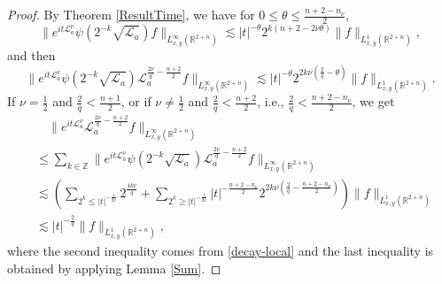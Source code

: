 \documentclass[10pt,a4paper]{amsart}
\begin{document}
\begin{proof}
By Theorem \ref{ResultTime}, we have for $0\leq \theta\leq \frac{n+2-n_\nu}{2}$,
\begin{equation*}
\|e^{it\mathcal{L}_a^\nu} \psi(2^{-k}\sqrt{\mathcal{L}_a})f\|_{L_{x,y}^\infty(\mathbb{R}^{2+n})}\lesssim |t|^{-\theta}2^{k(n+2-2\nu\theta)}\|f\|_{L_{x,y}^1(\mathbb{R}^{2+n})},
\end{equation*}
and then
\begin{equation}\label{decay-local}
\|e^{it\mathcal{L}_a^\nu} \psi(2^{-k}\sqrt{\mathcal{L}_a})\mathcal{L}_a^{\frac{2\nu}{q}-\frac{n+2}{2}}f\|_{L_{x,y}^\infty(\mathbb{R}^{2+n})}\lesssim |t|^{-\theta}2^{2k\nu(\frac{2}{q}-\theta)}\|f\|_{L_{x,y}^1(\mathbb{R}^{2+n})}.
\end{equation}
If $\nu=\frac{1}{2}$ and $\frac{2}{q}<\frac{n+1}{2}$, or if $\nu\not=\frac{1}{2}$ and $\frac{2}{q}<\frac{n+2}{2}$, i.e., $\frac{2}{q}<\frac{n+2-n_\nu}{2}$, we get
\begin{align*}
&\quad \|e^{it\mathcal{L}_a^\nu} \mathcal{L}_a^{\frac{2\nu}{q}-\frac{n+2}{2}}f\|_{L_{x,y}^\infty(\mathbb{R}^{2+n})}\\
&\leq \sum_{k\in\mathbb{Z}} \|e^{it\mathcal{L}_a^\nu} \psi(2^{-k}\sqrt{\mathcal{L}_a})\mathcal{L}_a^{\frac{2\nu}{q}-\frac{n+2}{2}}f\|_{L_{x,y}^\infty(\mathbb{R}^{2+n})}\\
&\lesssim \left(\sum_{2^k\leq |t|^{-\frac{1}{2\nu}}}2^{\frac{4k\nu}{q}}+\sum_{2^k\geq|t|^{-\frac{1}{2\nu}}}|t|^{-\frac{n+2-n_\nu}{2}}2^{2k\nu(\frac{2}{q}-\frac{n+2-n_\nu}{2})}\right)\|f\|_{L_{x,y}^1(\mathbb{R}^{2+n})}\\
&\lesssim |t|^{-\frac{2}{q}}\|f\|_{L_{x,y}^1(\mathbb{R}^{2+n})},
\end{align*}
where the second inequality comes from \eqref{decay-local} and the last inequality is obtained by applying Lemma \ref{Sum}. 


\end{proof}
\end{document}
